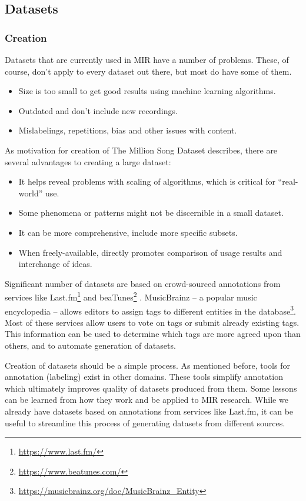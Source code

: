 \subsection{Datasets}

\subsubsection{Creation}

Datasets that are currently used in MIR have a number of problems. These, of course, don't apply to every dataset out there, but most do have some of them.
\begin{itemize}
    \item Size is too small to get good results using machine learning algorithms.
    \item Outdated and don't include new recordings.
    \item Mislabelings, repetitions, bias and other issues with content.
\end{itemize}

As motivation for creation of The Million Song Dataset \cite{millionsongdataset} describes, there are several advantages to creating a large dataset:
\begin{itemize}
    \item It helps reveal problems with scaling of algorithms, which is critical for ``real-world'' use.
    \item Some phenomena or patterns might not be discernible in a small dataset.
    \item It can be more comprehensive, include more specific subsets.
    \item When freely-available, directly promotes comparison of usage results and interchange of ideas.
\end{itemize}

Significant number of datasets are based on crowd-sourced annotations from services like Last.fm\footnote{\url{https://www.last.fm/}} and beaTunes\footnote{\url{https://www.beatunes.com/}} \cite{schreiber2015}. MusicBrainz -- a popular music encyclopedia -- allows editors to assign tags to different entities in the database\footnote{\url{https://musicbrainz.org/doc/MusicBrainz_Entity}}. Most of these services allow users to vote on tags or submit already existing tags. This information can be used to determine which tags are more agreed upon than others, and to automate generation of datasets.

Creation of datasets should be a simple process. As mentioned before, tools for annotation (labeling) exist in other domains. These tools simplify annotation which ultimately improves quality of datasets produced from them. Some lessons can be learned from how they work and be applied to MIR research. While we already have datasets based on annotations from services like Last.fm, it can be useful to streamline this process of generating datasets from different sources.

